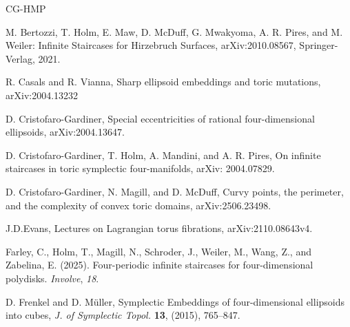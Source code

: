 \documentclass[11pt, reqno]{amsart}
\theoremstyle{remark}
\numberwithin{equation}{subsection}
\numberwithin{figure}{section}
\theoremstyle{customremark}
\begin{document}
 \begin{thebibliography}{CG-HMP}


 M. Bertozzi, T. Holm, E. Maw, D. McDuff, G. Mwakyoma, A. R. Pires, and M. Weiler:  Infinite Staircases for Hirzebruch Surfaces, arXiv:2010.08567, Springer-Verlag, 2021.


  R. Casals and R. Vianna, Sharp ellipsoid embeddings and toric mutations, arXiv:2004.13232

 D. Cristofaro-Gardiner, Special eccentricities of rational four-dimensional ellipsoids, 
arXiv:2004.13647.


D. Cristofaro-Gardiner, T. Holm, A. Mandini, and A. R. Pires,  On infinite staircases in toric symplectic four-manifolds, arXiv: 2004.07829.

D. Cristofaro-Gardiner, N. Magill, and D. McDuff, Curvy points, the perimeter, and the complexity of convex toric domains, arXiv:2506.23498.

 J.D.Evans, Lectures on Lagrangian torus fibrations, arXiv:2110.08643v4.



 Farley, C., Holm, T., Magill, N., Schroder, J., Weiler, M., Wang, Z., and Zabelina, E. (2025). Four-periodic infinite staircases for four-dimensional polydisks. \textit{Involve}, \textit{18}.

 D. Frenkel and D. M\"uller, Symplectic Embeddings of four-dimensional ellipsoids into cubes, {\it J. of Symplectic Topol.} {\bf 13}, (2015), 765--847. 



\end{thebibliography}
\end{document}
